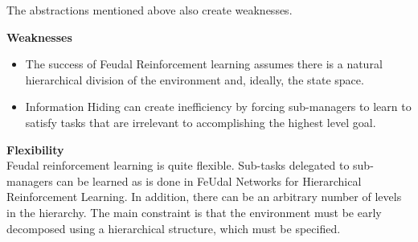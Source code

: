 The abstractions mentioned above also create weaknesses.

\textbf{Weaknesses}
\begin{itemize}
    \item The success of Feudal Reinforcement learning assumes there is a natural hierarchical division of the environment
          and, ideally, the state space.
    \item Information Hiding can create inefficiency by forcing sub-managers to learn to satisfy tasks that are irrelevant to
          accomplishing the highest level goal.
\end{itemize}

\textbf{Flexibility} \\
Feudal reinforcement learning is quite flexible. Sub-tasks delegated to sub-managers can be learned as is done in
FeUdal Networks for Hierarchical Reinforcement Learning. In addition, there can be an arbitrary number of levels in the
hierarchy. The main constraint is that the environment must be early decomposed using a hierarchical structure, which
must be specified.


